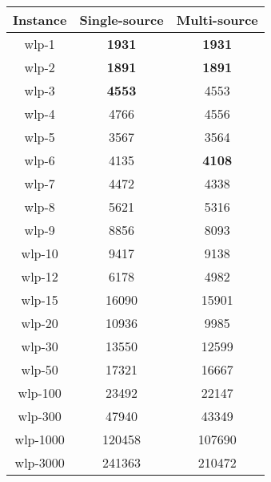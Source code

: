 \documentclass{article}
\newcommand{\sol}[1]{#1}
\newcommand{\opt}[1]{\textbf{#1}}
\begin{document}
\begin{table}[H]
    \begin{center}
        \begin{tabular}{|c|c|c|}
            \hline
            \textbf{Instance}&\textbf{Single-source}&\textbf{Multi-source}  \\
            \hline
            wlp-1         &   \opt{1931}   &     \opt{1931}     \\
            \hline
            wlp-2         &   \opt{1891}   &     \opt{1891}     \\
            \hline
            wlp-3         &   \opt{4553}   &     \sol{4553}     \\
            \hline
            wlp-4         &   \sol{4766}   &     \sol{4556}     \\
            \hline
            wlp-5         &   \sol{3567}   &     \sol{3564}     \\
            \hline
            wlp-6         &   \sol{4135}   &     \opt{4108}     \\
            \hline
            wlp-7         &   \sol{4472}   &     \sol{4338}     \\
            \hline
            wlp-8         &   \sol{5621}   &     \sol{5316}     \\
            \hline
            wlp-9         &   \sol{8856}   &     \sol{8093}     \\
            \hline
            wlp-10        &   \sol{9417}   &     \sol{9138}     \\
            \hline
            wlp-12        &   \sol{6178}   &     \sol{4982}     \\
            \hline
            wlp-15        &   \sol{16090}  &     \sol{15901}    \\
            \hline
            wlp-20        &   \sol{10936}  &     \sol{9985}     \\
            \hline
            wlp-30        &   \sol{13550}  &     \sol{12599}    \\
            \hline
            wlp-50        &   \sol{17321}  &     \sol{16667}    \\
            \hline
            wlp-100       &   \sol{23492}  &     \sol{22147}    \\
            \hline
            wlp-300       &   \sol{47940}  &     \sol{43349}    \\
            \hline
            wlp-1000      &   \sol{120458} &     \sol{107690}   \\
            \hline
            wlp-3000      &   \sol{241363} &     \sol{210472}   \\
            \hline
        \end{tabular}
    \end{center}
\end{table}
\end{document}
